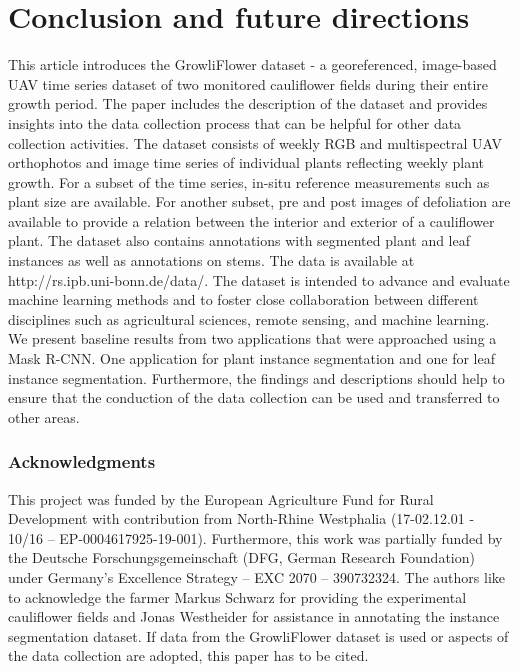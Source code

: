 \documentclass{article}
\begin{document}

\section{Conclusion and future directions}
\label{sec:conclusion}

This article introduces the GrowliFlower dataset - a georeferenced, image-based UAV time series dataset of two monitored cauliflower fields during their entire growth period.
The paper includes the description of the dataset and provides insights into the data collection process that can be helpful for other data collection activities. 
The dataset consists of weekly RGB and multispectral UAV orthophotos and image time series of individual plants reflecting weekly plant growth. For a subset of the time series, in-situ reference measurements such as plant size are available. For another subset, pre and post images of defoliation are available to provide a relation between the interior and exterior of a cauliflower plant.  
The dataset also contains annotations with segmented plant and leaf instances as well as annotations on stems. The data is available at http://rs.ipb.uni-bonn.de/data/.
The dataset is intended to advance and evaluate machine learning methods and to foster close collaboration between different disciplines such as agricultural sciences, remote sensing, and machine learning.
We present baseline results from two applications that were approached using a Mask R-CNN. One application for plant instance segmentation and one for leaf instance segmentation. 
Furthermore, the findings and descriptions should help to ensure that the conduction of the data collection can be used and transferred to other areas.






\subsubsection*{Acknowledgments} 
This project was funded by the European Agriculture Fund for Rural Development with contribution from North-Rhine Westphalia (17-02.12.01 - 10/16 – EP-0004617925-19-001).
Furthermore, this work was partially funded by the Deutsche Forschungsgemeinschaft (DFG, German Research Foundation) under Germany’s Excellence Strategy – EXC 2070 – 390732324.
The authors like to acknowledge the farmer Markus Schwarz for providing the experimental cauliflower fields and Jonas Westheider for assistance in annotating the instance segmentation dataset.
If data from the GrowliFlower dataset is used or aspects of the data collection are adopted, this paper has to be cited.
\end{document}
